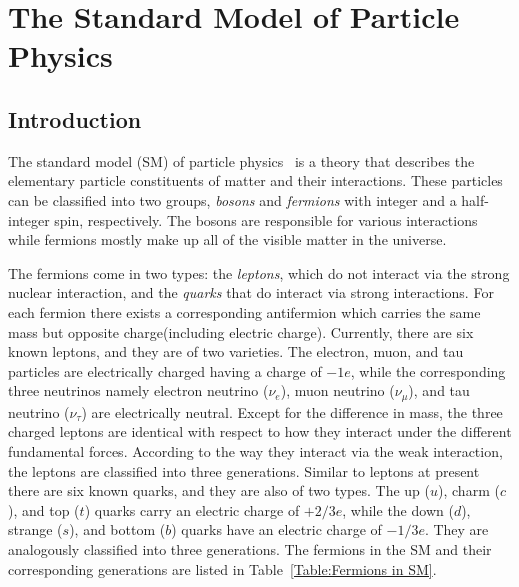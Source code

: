 \setcounter{section}{2}
\setcounter{subsection}{2}
\setcounter{subsubsection}{2}
\setcounter{equation}{0}
\chapter{The Standard Model of Particle Physics \label{The Standard Model of Particle Physics}}
\section{Introduction}
The standard model (SM) of particle physics~\cite{sm, APichSM} is a theory that describes the elementary particle constituents of matter and their interactions. These particles can be classified into two groups, \textit{bosons} and \textit{fermions} with integer and a half-integer spin, respectively. The bosons are responsible for various interactions while fermions mostly make up all of the visible matter in the universe. 

The fermions come in two types: the \textit{leptons}, which do not interact via the strong nuclear interaction, and the \textit{quarks} that do interact via strong interactions. For each fermion there exists a corresponding antifermion which carries the same mass but opposite charge(including electric charge). Currently, there are six known leptons, and they are of two varieties. The electron, muon, and tau particles are electrically charged having a charge of $-1e$, while the corresponding three neutrinos namely electron neutrino ($\nu_e$), muon neutrino ($\nu_\mu$), and tau neutrino ($\nu_\tau$) are electrically neutral. Except for the difference in mass, the three charged leptons are identical with respect to how they interact under the different fundamental forces. According to the way they interact via the weak interaction, the leptons are classified into three generations. Similar to leptons at present there are six known quarks, and they are also of two types. The up ($u$), charm ($c$), and top ($t$) quarks carry an electric charge of $+2/3e$, while the down ($d$), strange ($s$), and bottom ($b$) quarks have an electric charge of $-1/3e$. They are analogously classified into three generations. The fermions in the SM and their corresponding generations are listed in Table~\ref{Table:Fermions in SM}.

